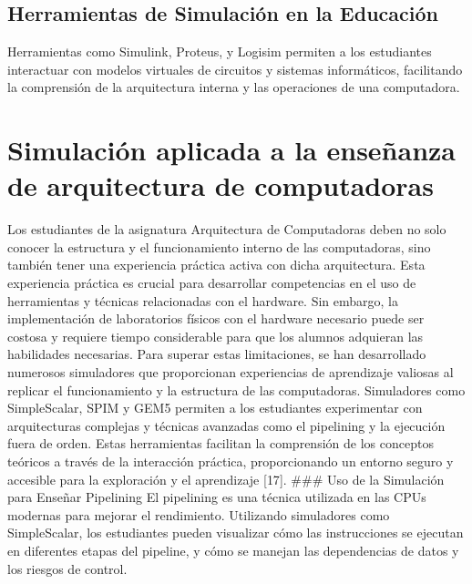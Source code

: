 \documentclass[12pt,twoside]{templates/unerthesis}
\begin{document}
\hypertarget{herramientas-de-simulaciuxf3n-en-la-educaciuxf3n}{%
\subsection{Herramientas de Simulación en la Educación}\label{herramientas-de-simulaciuxf3n-en-la-educaciuxf3n}}

Herramientas como Simulink, Proteus, y Logisim permiten a los estudiantes interactuar con modelos virtuales de circuitos y sistemas informáticos, facilitando la comprensión de la arquitectura interna y las operaciones de una computadora.

\hypertarget{simulaciuxf3n-aplicada-a-la-enseuxf1anza-de-arquitectura-de-computadoras}{%
\section{Simulación aplicada a la enseñanza de arquitectura de computadoras}\label{simulaciuxf3n-aplicada-a-la-enseuxf1anza-de-arquitectura-de-computadoras}}

Los estudiantes de la asignatura Arquitectura de Computadoras deben no solo conocer la estructura y el funcionamiento interno de las computadoras, sino también tener una experiencia práctica activa con dicha arquitectura. Esta experiencia práctica es crucial para desarrollar competencias en el uso de herramientas y técnicas relacionadas con el hardware. Sin embargo, la implementación de laboratorios físicos con el hardware necesario puede ser costosa y requiere tiempo considerable para que los alumnos adquieran las habilidades necesarias.
Para superar estas limitaciones, se han desarrollado numerosos simuladores que proporcionan experiencias de aprendizaje valiosas al replicar el funcionamiento y la estructura de las computadoras. Simuladores como SimpleScalar, SPIM y GEM5 permiten a los estudiantes experimentar con arquitecturas complejas y técnicas avanzadas como el pipelining y la ejecución fuera de orden. Estas herramientas facilitan la comprensión de los conceptos teóricos a través de la interacción práctica, proporcionando un entorno seguro y accesible para la exploración y el aprendizaje {[}17{]}.
\#\#\# Uso de la Simulación para Enseñar Pipelining
El pipelining es una técnica utilizada en las CPUs modernas para mejorar el rendimiento. Utilizando simuladores como SimpleScalar, los estudiantes pueden visualizar cómo las instrucciones se ejecutan en diferentes etapas del pipeline, y cómo se manejan las dependencias de datos y los riesgos de control.
\end{document}
